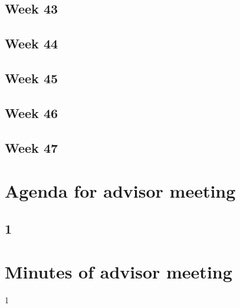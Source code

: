 \subsection{Week 43}

\subsection{Week 44}

\subsection{Week 45}

\subsection{Week 46}

\subsection{Week 47}

\section{Agenda for advisor meeting}

\subsection{1}


\section{Minutes of advisor meeting}

1